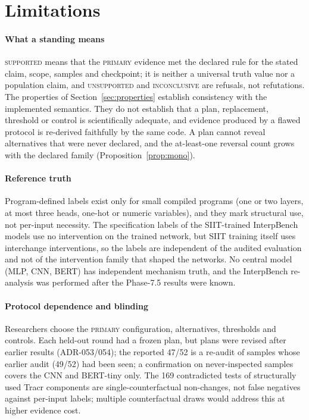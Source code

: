 \section{Limitations}
\label{sec:limits}

\paragraph*{What a standing means}
\textsc{supported} means that the \textsc{primary} evidence met the declared rule for the stated claim, scope, samples and checkpoint; it is neither a universal truth value nor a population claim, and \textsc{unsupported} and \textsc{inconclusive} are refusals, not refutations. The properties of Section~\ref{sec:properties} establish consistency with the implemented semantics. They do not establish that a plan, replacement, threshold or control is scientifically adequate, and evidence produced by a flawed protocol is re-derived faithfully by the same code. A plan cannot reveal alternatives that were never declared, and the at-least-one reversal count grows with the declared family (Proposition~\ref{prop:mono}).

\paragraph*{Reference truth}
Program-defined labels exist only for small compiled programs (one or two layers, at most three heads, one-hot or numeric variables), and they mark structural use, not per-input necessity. The specification labels of the SIIT-trained InterpBench models use no intervention on the trained network, but SIIT training itself uses interchange interventions, so the labels are independent of the audited evaluation and not of the intervention family that shaped the networks. No central model (MLP, CNN, BERT) has independent mechanism truth, and the InterpBench re-analysis was performed after the Phase-7.5 results were known.

\paragraph*{Protocol dependence and blinding}
Researchers choose the \textsc{primary} configuration, alternatives, thresholds and controls. Each held-out round had a frozen plan, but plans were revised after earlier results (ADR-053/054); the reported 47/52 is a re-audit of samples whose earlier audit (49/52) had been seen; a confirmation on never-inspected samples covers the CNN and BERT-tiny only. The 169 contradicted tests of structurally used Tracr components are single-counterfactual non-changes, not false negatives against per-input labels; multiple counterfactual draws would address this at higher evidence cost.

